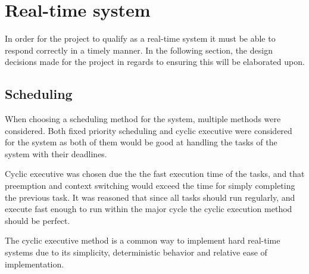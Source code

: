 \section{Real-time system}\label{Design:RTS} 
In order for the project to qualify as a real-time system it must be able to respond correctly in a timely manner.
In the following section, the design decisions made for the project in regards to ensuring this will be elaborated upon. 

\subsection{Scheduling}\label{Design:Scheduling}
When choosing a scheduling method for the system, multiple methods were considered. 
Both fixed priority scheduling and cyclic executive were considered for the system as both of them would be good at handling the tasks of the system with their deadlines.

Cyclic executive was chosen due the the fast execution time of the tasks, and that preemption and context switching would exceed the time for simply completing the previous task. 
It was reasoned that since all tasks should run regularly, and execute fast enough to run within the major cycle the cyclic execution method should be perfect. 

The cyclic executive method is a common way to implement hard real-time systems due to its simplicity, deterministic behavior and relative ease of implementation\cite{CyclicExecutionKimLarsen}.